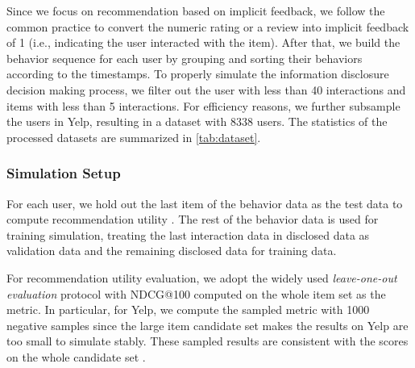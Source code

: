  Since we focus on recommendation based on implicit feedback, we follow the common practice to convert the numeric rating or a review into implicit feedback of 1 (i.e., indicating the user interacted with the item). %
 After that, we build the behavior sequence for each user by grouping and sorting their behaviors according to the timestamps.
 To properly simulate the information disclosure decision making process, we filter out the user with less than 40 interactions and items with less than 5 interactions.
 For efficiency reasons, we further subsample the users in Yelp, resulting in a dataset with 8338 users.
The statistics of the processed datasets are summarized in \cref{tab:dataset}.




\subsubsection{Simulation Setup}

For each user, we hold out the last item of the behavior data as the test data to compute recommendation utility \cite{NCF,kang2018self,Sun:cikm19:BERT4Rec}.
The rest of the behavior data is used for training simulation, treating the last interaction data in disclosed data as validation data and the remaining disclosed data for training data.

For recommendation utility evaluation, we adopt the widely used \textit{leave-one-out evaluation} \cite{NCF,kang2018self,Sun:cikm19:BERT4Rec} protocol with  NDCG@100 computed on the whole item set as the metric.
In particular, for Yelp, we compute the sampled metric with 1000 negative samples since the large item candidate set makes the results on Yelp are too small to simulate stably.
These sampled results are consistent with the scores on the whole candidate set \cite{krichene2020sampled}.

